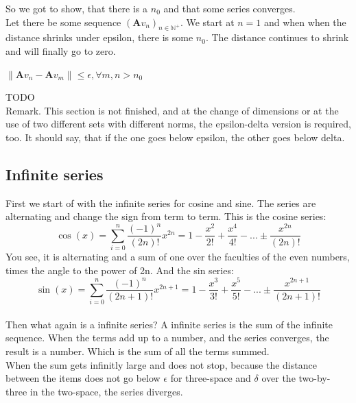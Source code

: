 \documentclass[a4paper]{article}
\begin{document}
\begin{Example}
So we got to show, that there is a $n_{0}$ and that some series converges.\\

Let there be some sequence $(\boldsymbol{A}v_{n})_{n\in\mathbb{N}^{+}}$.
We start at $n=1$ and when   when the distance shrinks under epsilon, there is some $n_{0}$. The distance continues to shrink and will finally go to zero.

\begin{center}
$\|\boldsymbol{A}v_{n} - \boldsymbol{A}v_{m}\| \leq \epsilon,  \forall m,n > n_{0}$
\end{center}

TODO\\

Remark. This section is not finished, and at the change of dimensions or at the use of two different sets with different norms, the epsilon-delta version is required, too. It should say, that if the one goes below epsilon, the other goes below delta.\\

\subsection{Infinite series}

First we start of with the infinite series for cosine and sine. The series are alternating and change the sign from term to term.
This is the cosine series:\\
\begin{displaymath}
    \cos(x) = \sum_{i=0}^{n}\frac{(-1)^{n}}{(2n)!}x^{2n} = 1 - \frac{x^{2}}{2!} + \frac{x^{4}}{4!} - ... \pm\frac{x^{2n}}{(2n)!}
\end{displaymath}
You see, it is alternating and a sum of one over the faculties of the even numbers, times the angle to the power of 2n.
And the sin series:\\
\begin{displaymath}
    \sin(x) = \sum_{i=0}^{n}\frac{(-1)^{n}}{(2n+1)!}x^{2n+1} = 1 - \frac{x^{3}}{3!} + \frac{x^{5}}{5!} - ... \pm\frac{x^{2n+1}}{(2n+1)!}
\end{displaymath}\\

Then what again is a infinite series? A infinite series is the sum of the infinite sequence. When the terms add up to a number, and the series converges, the result is a number. Which is the sum of all the terms summed.\\
 
When the sum gets infinitly large and does not stop, because the distance between the items does not go below $\epsilon$ for three-space and $\delta$ over the two-by-three in the two-space, the series diverges.\\


\end{Example}
\end{document}
